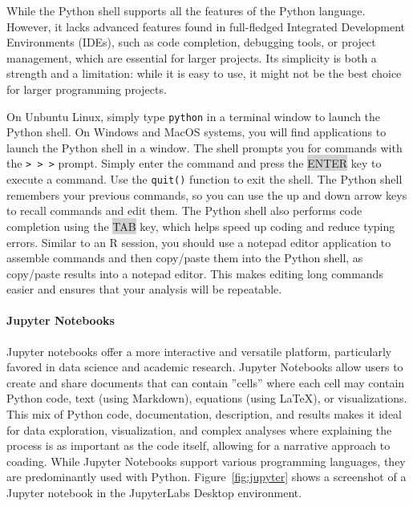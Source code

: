 While the Python shell supports all the features of the Python language. However, it lacks advanced features found in full-fledged Integrated Development Environments (IDEs), such as code completion, debugging tools, or project management, which are essential for larger projects. Its simplicity is both a strength and a limitation: while it is easy to use, it might not be the best choice for larger programming projects.

On Unbuntu Linux, simply type \texttt{python} in a terminal window to launch the Python shell. On Windows and MacOS systems, you will find applications to launch the Python shell in a window. The shell prompts you for commands with the \texttt{> > >} prompt. Simply enter the command and press the \colorbox{lightgray}{ENTER} key to execute a command. Use the \texttt{quit()} function to exit the shell. The Python shell remembers your previous commands, so you can use the up and down arrow keys to recall commands and edit them. The Python shell also performs code completion using the \colorbox{lightgray}{TAB} key, which helps speed up coding and reduce typing errors. Similar to an R session, you should use a notepad editor application to assemble commands and then copy/paste them into the Python shell, as copy/paste results into a notepad editor. This makes editing long commands easier and ensures that your analysis will be repeatable.


\paragraph*{Jupyter Notebooks} Jupyter notebooks offer a more interactive and versatile platform, particularly favored in data science and academic research. Jupyter Notebooks allow users to create and share documents that can contain ''cells'' where each cell may contain Python code, text (using Markdown), equations (using LaTeX), or visualizations. This mix of Python code, documentation, description, and results makes it ideal for data exploration, visualization, and complex analyses where explaining the process is as important as the code itself, allowing for a narrative approach to coading. While Jupyter Notebooks support various programming languages, they are predominantly used with Python. Figure~\ref{fig:jupyter} shows a screenshot of a Jupyter notebook in the JupyterLabs Desktop environment.

